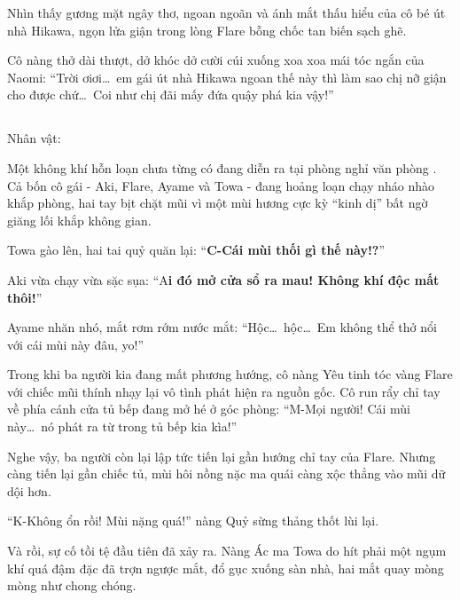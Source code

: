 \documentclass[../main.tex]{subfiles}
\begin{document}
Nhìn thấy gương mặt ngây thơ, ngoan ngoãn và ánh mắt thấu hiểu của cô bé út nhà Hikawa, ngọn lửa giận trong lòng Flare bỗng chốc tan biến sạch ghẽ.

Cô nàng thở dài thượt, dở khóc dở cười cúi xuống xoa xoa mái tóc ngắn của Naomi:  ``Trời ơiơi\dots\ em gái út nhà Hikawa ngoan thế này thì làm sao chị nỡ giận cho được chứ\dots\ Coi như chị đãi mấy đứa quậy phá kia vậy!''

\newpage

\subsection*{\label{ep-C9.VII}}
\vspace{-4pt}
\begin{center}
  {\caviar\fontsize{12pt}{12pt}\selectfont Nhân vật:      }
\end{center}

Một không khí hỗn loạn chưa từng có đang diễn ra tại phòng nghỉ văn phòng \hll. Cả bốn cô gái - Aki, Flare, Ayame và Towa - đang hoảng loạn chạy nháo nhào khắp phòng, hai tay bịt chặt mũi vì một mùi hương cực kỳ ``kinh dị'' bất ngờ giăng lối khắp không gian.

Towa gào lên, hai tai quỷ quăn lại: ``\textbf{C-Cái mùi thối gì thế này!?}''

Aki vừa chạy vừa sặc sụa: ``A\textbf{i đó mở cửa sổ ra mau! Không khí độc mất thôi!}''

Ayame nhăn nhó, mắt rơm rớm nước mắt: ``Hộc\dots\ hộc\dots\ Em không thể thở nổi với cái mùi này đâu, yo!''

Trong khi ba người kia đang mất phương hướng, cô nàng Yêu tinh tóc vàng Flare với chiếc mũi thính nhạy lại vô tình phát hiện ra nguồn gốc. Cô run rẩy chỉ tay về phía cánh cửa tủ bếp đang mở hé ở góc phòng: ``M-Mọi người! Cái mùi này\dots\ nó phát ra từ trong tủ bếp kia kìa!''

Nghe vậy, ba người còn lại lập tức tiến lại gần hướng chỉ tay của Flare. Nhưng càng tiến lại gần chiếc tủ, mùi hôi nồng nặc ma quái càng xộc thẳng vào mũi dữ dội hơn.

``K-Không ổn rồi! Mùi nặng quá!'' nàng Quỷ sừng thảng thốt lùi lại.

Và rồi, sự cố tồi tệ đầu tiên đã xảy ra. Nàng Ác ma Towa do hít phải một ngụm khí quá đậm đặc đã trợn ngược mắt, đổ gục xuống sàn nhà, hai mắt quay mòng mòng như chong chóng.
\end{document}
